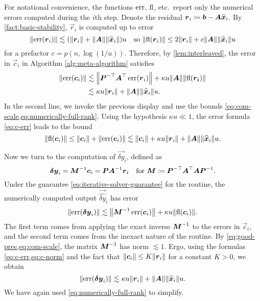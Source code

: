 \documentclass[onefignum,onetabnum,pagebackref,dvipsnames]{siamart220329}
\begin{document}
For notational convenience, the functions $\operatorname{err}$, $\operatorname{fl}$, etc.\ report only the numerical errors computed during the $i$th step.
Denote the residual $\boldsymbol{r}_i \coloneqq \boldsymbol{b} - \boldsymbol{A}\boldsymbol{\widehat{x}}_i$.
By \cref{fact:basic-stability}, $\vec{r}_i$ is computed up to error
%
\begin{equation*}
    \norm{\err(\vec{r}_i)} \lesssim (\norm{\vec{r}_i} + \norm{\mat{A}}\norm{\vec{\hat{x}}_i}) u \quad \text{so } \norm{\fl(\vec{r}_i)} \le 2\norm{\vec{r}_i}+ c\norm{\mat{A}}\norm{\vec{\hat{x}}_i} u 
\end{equation*}
%
for a prefactor $c = p(n,\log(1/u))$.
%
Therefore, by \cref{lem:interleaved}, the error in $\vec{c}_i$ in Algorithm \ref{alg:meta-algorithm} satisfies
%
\begin{equation} \label{eq:c-err}
    \begin{split}
    \norm{\err(\vec{c}_i)} &\lesssim \norm{\mat{P}^{-\top}\mat{A}^\top \err(\vec{r}_i)} + \kappa u \norm{\mat{A}}\norm{\fl(\vec{r_i})} \\
    &\lesssim \kappa u \norm{\vec{r}_i} + \norm{\mat{A}}\norm{\vec{\hat{x}}_i}u.
    \end{split}
\end{equation}
%
In the second line, we invoke the previous display and use the bounds \cref{eq:com-scale,eq:numerically-full-rank}.
Using the hypothesis $\kappa u \ll 1$, the error formula \cref{eq:c-err} leads to the bound
%
\begin{equation}\label{eq:c-norm}
    \norm{\fl(\vec{c}_i)} \le \norm{\vec{c}_i} +  \norm{\err(\vec{c}_i)} \lesssim \norm{\vec{c}_i} + \kappa u\norm{\vec{r}_i} + \norm{\mat{A}}\norm{\vec{\hat{x}}_i} u .
\end{equation}

Now we turn to the computation of $\vec{\delta y}_i$, defined as
%
\begin{equation} \label{eq:dy}
    \boldsymbol{\delta y}_i = \boldsymbol{M}^{-1}\boldsymbol{c}_i = \boldsymbol{P}\boldsymbol{A}^{-1}\boldsymbol{r}_i \quad \text{for } \boldsymbol{M} \coloneqq \boldsymbol{P}^{-\top}\boldsymbol{A}^\top\boldsymbol{A}\boldsymbol{P}^{-1}.
\end{equation}
%
Under the guarantee \cref{eq:iterative-solver-guarantee} for the  routine, the numerically computed output $\vec{\hat{\delta y}}_i$ has error
%
\begin{equation*}
    \norm{\err(\vec{\delta y}_i)} \lesssim \norm{\mat{M}^{-1}\err(\vec{c}_i)} + \kappa u \norm{\fl(\vec{c}_i)}.
\end{equation*}
%
The first term comes from applying the exact inverse $\boldsymbol{M}^{-1}$ to the errors in $\vec{c}_i$, and the second term comes from the inexact nature of the  routine.
By \cref{eq:good-prec,eq:com-scale}, the matrix $\boldsymbol{M}^{-1}$ has norm $\lesssim 1$.
Ergo, using the formulas \cref{eq:c-err,eq:c-norm} and the fact that $\norm{\vec{c}_i} \le K\norm{\vec{r}_i}$ for a constant $K>0$, we obtain
%
\begin{equation} \label{eq:err-dy}
    \norm{\err(\vec{\delta y}_i)} \lesssim \kappa u \norm{\vec{r}_i} + \norm{\mat{A}}\norm{\vec{\hat{x}}_i}u.
\end{equation}
%
We have again used \cref{eq:numerically-full-rank} to simplify.
\end{document}
